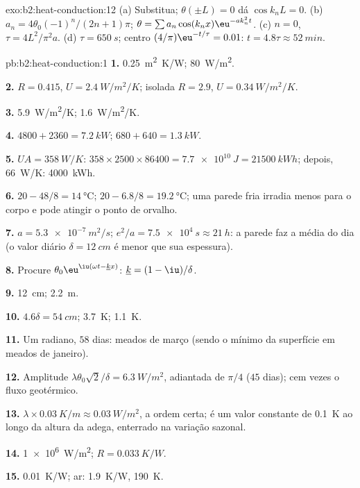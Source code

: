 \begin{solution}{exo:b2:heat-conduction:12}
(a) Substitua; $\theta(\pm L) = 0$ dá $\cos k_nL = 0$. (b) $a_n =
4\theta_0(-1)^n/(2n+1)\pi$; $\theta = \sum a_n\cos(k_nx)\eu^{-ak_n^2t}$. (c) $n = 0$,
$\tau = 4L^2/\pi^2a$. (d) $\tau = \qty{650}{s}$; centro $(4/\pi)\eu^{-t/\tau} = 0.01$:
$t = 4.8\tau \approx \qty{52}{min}$.
\end{solution}

\begin{solution}{pb:b2:heat-conduction:1}
\textbf{1.} \qty{0.25}{m^2.K/W}; \qty{80}{W/m^2}.

\textbf{2.} $R = 0.415$, $U = \qty{2.4}{W/m^2/K}$; isolada $R = 2.9$, $U =
\qty{0.34}{W/m^2/K}$.

\textbf{3.} \qty{5.9}{W/m^2/K}; \qty{1.6}{W/m^2/K}.

\textbf{4.} $4800 + 2360 = \qty{7.2}{kW}$; $680 + 640 = \qty{1.3}{kW}$.

\textbf{5.} $UA = \qty{358}{W/K}$: $358 \times 2500 \times 86400 = \qty{7.7e10}{J} =
\qty{21500}{kWh}$; depois, \qty{66}{W/K}: \qty{4000}{kWh}.

\textbf{6.} $20 - 48/8 = \qty{14}{\celsius}$; $20 - 6.8/8 = \qty{19.2}{\celsius}$;
uma parede fria irradia menos para o corpo e pode atingir o ponto de orvalho.

\textbf{7.} $a = \qty{5.3e-7}{m^2/s}$; $e^2/a = \qty{7.5e4}{s} \approx \qty{21}{h}$: a
parede faz a média do dia (o valor diário $\delta = \qty{12}{cm}$ é menor que
sua espessura).

\textbf{8.} Procure $\theta_0\eu^{\iu(\omega t - \underline kx)}$: $\underline k = (1 - \iu)/\delta$.

\textbf{9.} \qty{12}{cm}; \qty{2.2}{m}.

\textbf{10.} $4.6\delta = \qty{54}{cm}$; \qty{3.7}{K}; \qty{1.1}{K}.

\textbf{11.} Um radiano, $58$ dias: meados de março (sendo o mínimo da
superfície em meados de janeiro).

\textbf{12.} Amplitude $\lambda\theta_0\sqrt2/\delta = \qty{6.3}{W/m^2}$, adiantada de
$\pi/4$ ($45$ dias); cem vezes o fluxo geotérmico.

\textbf{13.} $\lambda \times \qty{0.03}{K/m} \approx \qty{0.03}{W/m^2}$, a ordem certa; é
um valor constante de \qty{0.1}{K} ao longo da altura da adega, enterrado na
variação sazonal.

\textbf{14.} \qty{1e6}{W/m^2}; $R = \qty{0.033}{K/W}$.

\textbf{15.} \qty{0.01}{K/W}; ar: \qty{1.9}{K/W}, \qty{190}{K}.


\end{solution}
